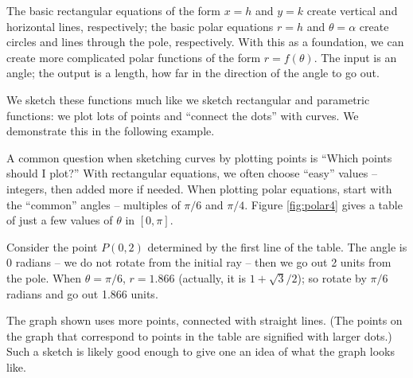 The basic rectangular equations of the form $x=h$ and $y=k$ create vertical and horizontal lines, respectively; the basic polar equations $r= h$ and $\theta =\alpha$ create circles and lines through the pole, respectively. With this as a foundation, we can create more complicated polar functions of the form $r=f(\theta)$. The input is an angle; the output is a length, how far in the direction of the angle to go out.

We sketch these functions much like we sketch rectangular and parametric functions: we plot lots of points and ``connect the dots'' with curves. We demonstrate this in the following example.\\

{A common question when sketching curves by plotting points is ``Which points should I plot?'' With rectangular equations, we often choose ``easy'' values -- integers, then added more if needed. When plotting polar equations, start with the ``common'' angles -- multiples of $\pi/6$ and $\pi/4$. Figure \ref{fig:polar4} gives a table of just a few values of $\theta$ in $[0,\pi]$. 

Consider the point $P(0,2)$ determined by the first line of the table. The angle is 0 radians -- we do not rotate from the initial ray -- then we go out 2 units from the pole. When $\theta=\pi/6$, $r = 1.866$ (actually, it is $1+\sqrt{3}/2$); so rotate by $\pi/6$ radians and go out 1.866 units. 

The graph shown uses more points, connected with straight lines. (The points on the graph that correspond to points in the table are signified with larger dots.) Such a sketch is likely good enough to give one an idea of what the graph looks like.
}\\

